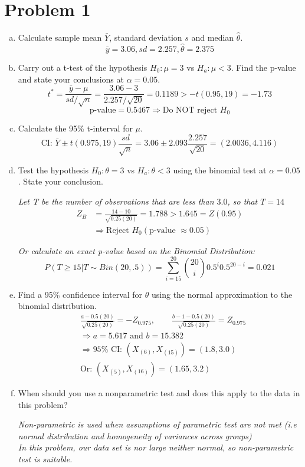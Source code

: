 \documentclass[12pt]{article}
\begin{document}
\section*{Problem 1}
\begin{enumerate}[(a)]
\item Calculate sample mean $\bar Y$, standard deviation $s$ and median $\hat\theta$.
\[ \bar{y}=3.06, sd=2.257, \hat{\theta}=2.375 \]

\item Carry out a t-test of the hypothesis $H_0: \mu=3$ vs $H_a: \mu<3$.
Find the p-value and state your conclusions at $\alpha=0.05$.
\[ t^*=\frac{\bar{y}-\mu}{sd/\sqrt{n}}=\frac{3.06-3}{2.257/\sqrt{20}}=0.1189 > -t(0.95,19)=-1.73 \]
\[ \text{p-value} = 0.5467 \Rightarrow \text{Do NOT reject } H_0 \] 

\item Calculate the 95\% t-interval for $\mu$.
\[ \text{CI: } \bar{Y} \pm t(0.975,19) \frac{sd}{\sqrt{n}} = 3.06 \pm 2.093 \frac{2.257}{\sqrt{20}} = (2.0036,4.116) \]

\item Test the hypothesis $H_0: \theta=3$ vs $H_a:\theta<3$ using the binomial test at
$\alpha=0.05$. State your conclusion.

\emph{Let T be the number of observations that are less than $3.0$, so that $T = 14$}
\begin{align*}
Z_B &= \frac{14-10}{\sqrt{0.25(20)}} = 1.788 > 1.645 = Z(0.95) \\
&\Rightarrow \text{Reject } H_0 (\text{p-value } \approx 0.05)
\end{align*}

\emph{Or calculate an exact p-value based on the Binomial Distribution: }
\[ P \left. \left(T \geq 15 \right| T \sim Bin(20, .5) \right) = \sum_{i=15}^{20} \binom{20}{i}0.5^i0.5^{20-i} = 0.021\]

\item Find a 95\% confidence interval for $\theta$ using the normal approximation
to the binomial distribution.
\begin{align*}
& \frac{a-0.5(20)}{\sqrt{0.25(20)}}=-Z_{0.975}, \qquad \frac{b-1-0.5(20)}{\sqrt{0.25(20)}}=Z_{0.975} \\
& \Rightarrow a = 5.617 \text{ and } b = 15.382 \\
& \Rightarrow 95\% \text{ CI: } (X_{(6)}, X_{(15)})=(1.8, 3.0) \tag*{(With the common rounding method)}\\
& \text{Or: } (X_{(5)}, X_{(16)})=(1.65, 3.2) \tag*{(With floor lower bound the ceiling upper bound)}
\end{align*}

\item When should you use a nonparametric test and does this apply to the data in this problem?

\emph{Non-parametric is used when assumptions of parametric test are not met (i.e normal distribution and homogeneity of variances across groups) \\
In this problem, our data set is nor large neither normal, so non-parametric test is suitable.}
\end{enumerate}
\end{document}

